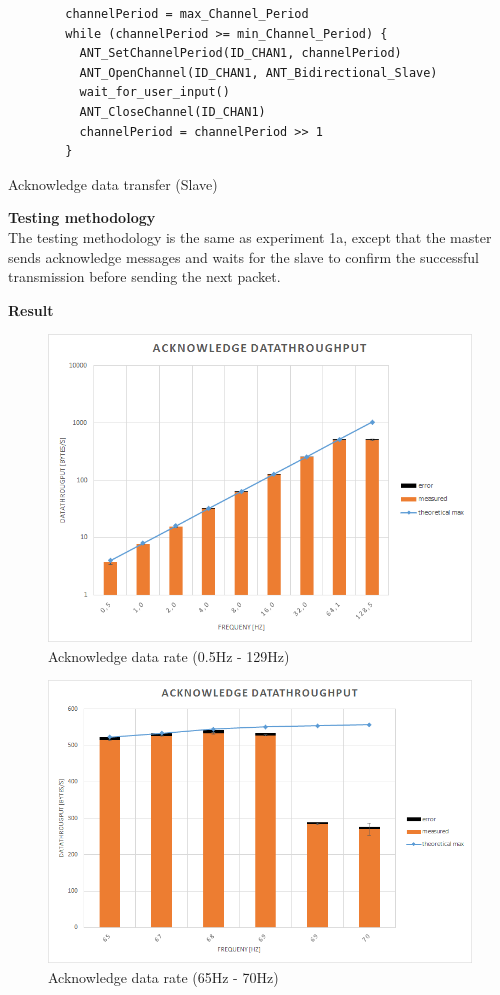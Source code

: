 \begin{description}
	\begin{code}[H]
		\begin{verbatim}
		channelPeriod = max_Channel_Period
		while (channelPeriod >= min_Channel_Period) {
		  ANT_SetChannelPeriod(ID_CHAN1, channelPeriod)
		  ANT_OpenChannel(ID_CHAN1, ANT_Bidirectional_Slave)
		  wait_for_user_input()
		  ANT_CloseChannel(ID_CHAN1)
		  channelPeriod = channelPeriod >> 1
		}
		\end{verbatim}
		\caption{Acknowledge data transfer (Slave)}\label{lst:sExp4}
	\end{code}
	\item{\textbf{Testing methodology}} \hfill \\ The testing methodology is the same as experiment 1a, except that the master sends acknowledge messages and waits for the slave to confirm the successful transmission before sending the next packet. 
	\item{\textbf{Result}} \hfill \\
	\begin{figure}[H]
		\centering
		\includegraphics[scale=0.5]{./pics/exp4_norm.png}
		\caption{Acknowledge data rate (0.5Hz - 129Hz)}\label{fig:exp4norm}
	\end{figure}
	\begin{figure}[H]
		\centering
		\includegraphics[scale=0.5]{./pics/exp4_detail.png}
		\caption{Acknowledge data rate (65Hz - 70Hz)}\label{fig:exp4between}
	\end{figure}
	

\end{description}
